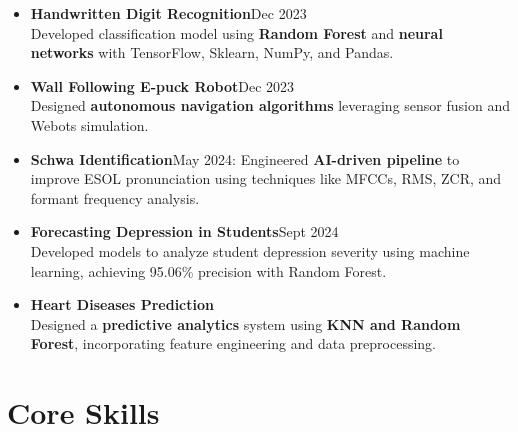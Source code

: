 \documentclass[10 pt, letterpaper]{article}
\begin{document}
\begin{itemize}
    \vspace{-0.15cm}
    \item \textbf{Handwritten Digit Recognition}\textbar Dec 2023 \\ Developed classification model using \textbf{Random Forest} and \textbf{neural networks} with TensorFlow, Sklearn, NumPy, and Pandas.
    \vspace{-0.15cm}
        \item \textbf{Wall Following E-puck Robot}\textbar Dec 2023 \\Designed \textbf{autonomous navigation algorithms} leveraging sensor fusion and Webots simulation.
    \vspace{-0.15cm}
    \item \textbf{Schwa Identification}\textbar May 2024: Engineered \textbf{AI-driven pipeline} to improve ESOL pronunciation using techniques like MFCCs, RMS, ZCR, and formant frequency analysis.
    \vspace{-0.15cm}
    \item \textbf{Forecasting Depression in Students}\textbar Sept 2024\\ Developed models to analyze student depression severity using machine learning, achieving 95.06\% precision with Random Forest.
    \vspace{-0.15cm}
    \item \textbf{Heart Diseases Prediction} \\ Designed a \textbf{predictive analytics} system using \textbf{KNN and Random Forest}, incorporating feature engineering and data preprocessing.
    
\end{itemize}

\section*{Core Skills}
\end{document}
